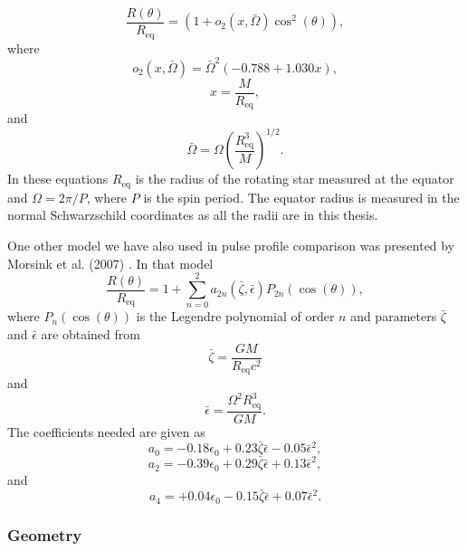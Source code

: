 \documentclass{wihuri}
\def\be{\begin{equation}}
\def\ee{\end{equation}}
\begin{document}
\begin{equation}
\label{rtheta2}
\frac{R(\theta)}{R_{\mathrm{eq}}} = (1 + o_{2}(x,\bar{\Omega})\cos^{2}(\theta)),
\end{equation}
where
\begin{equation}
\label{otwo}
o_{2}(x,\bar{\Omega}) = \bar{\Omega}^{2}(-0.788+1.030x),
\end{equation}
\begin{equation}
\label{rtheta2x}
x = \frac{M}{R_{\mathrm{eq}}},
\end{equation}
and
\begin{equation}
\label{rtheta2omega}
\bar{\Omega} = \Omega \left(\frac{R_{\mathrm{eq}}^{3}}{M} \right)^{1/2}.
\end{equation}
In these equations $R_{\mathrm{eq}}$ is the radius of the rotating star measured at the equator and $\Omega = 2\pi/P$, where $P$ is the spin period. The equator radius is measured in the normal Schwarzschild coordinates as all the radii are in this thesis.

One other model we have also used in pulse profile comparison was presented by Morsink et al. (2007) \cite{morsink}. In that model
\be\label{eq:rtheta}
\frac{R(\theta)}{R_{\mathrm{eq}}} = 1 + \sum\limits_{n=0}^2 a_{2n}(\bar{\zeta},\bar{\epsilon})P_{2n}(\cos(\theta)), 
\ee
where $P_{n}(\cos(\theta))$ is the Legendre polynomial of order $n$ and parameters $\bar{\zeta}$ and $\bar{\epsilon}$ are obtained from
\be\label{eq:parzeta}
\bar{\zeta} = \frac{GM}{R_{\mathrm{eq}}c^{2}}
\ee
and
\be\label{eq:parepsilon}
\bar{\epsilon} = \frac{\Omega^{2}R_{\mathrm{eq}}^{3}}{GM}.
\ee
The coefficients needed are given as
\be\label{eq:azero}
a_{0} = -0.18\epsilon_{0}+0.23\bar{\zeta}\bar{\epsilon}-0.05\bar{\epsilon}^{2}, 
\ee
\be\label{eq:atwo}
a_{2} = -0.39\epsilon_{0}+0.29\bar{\zeta}\bar{\epsilon}+0.13\bar{\epsilon}^{2},
\ee
and
\be\label{eq:afour}
a_{4} = +0.04\epsilon_{0}-0.15\bar{\zeta}\bar{\epsilon}+0.07\bar{\epsilon}^{2}.
\ee


\subsubsection{Geometry}
\end{document}
